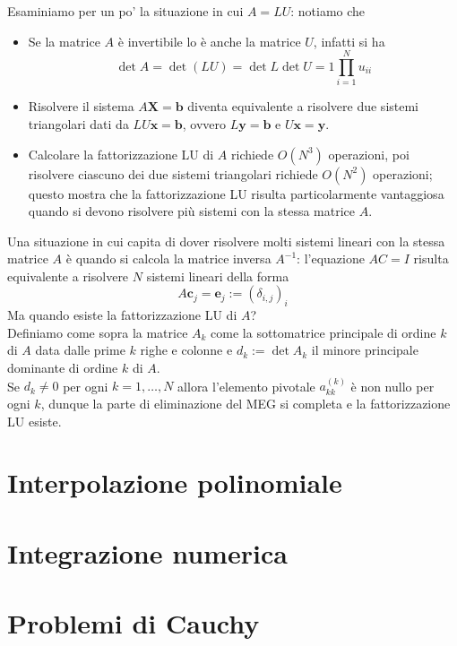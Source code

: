 \documentclass[openany]{book}
\begin{document}
Esaminiamo per un po' la situazione in cui $A = LU$: notiamo che\begin{itemize}
    \item Se la matrice $A$ è invertibile lo è anche la matrice $U$, infatti si ha 
    \[\det A = \det(LU) = \det L \det U = 1 \prod_{i=1}^N u_{ii}\]
    \item Risolvere il sistema $A\mathbf X = \mathbf b$ diventa equivalente a risolvere due sistemi triangolari dati da $LU\mathbf x = \mathbf b$, ovvero $L\mathbf y = \mathbf b$ e $U\mathbf x = \mathbf y$.
    \item Calcolare la fattorizzazione LU di $A$ richiede $O(N^3)$ operazioni, poi risolvere ciascuno dei due sistemi triangolari richiede $O(N^2)$ operazioni; questo mostra che la fattorizzazione LU risulta particolarmente vantaggiosa quando si devono risolvere più sistemi con la stessa matrice $A$.
\end{itemize}
Una situazione in cui capita di dover risolvere molti sistemi lineari con la stessa matrice $A$ è quando si calcola la matrice inversa $A^{-1}$: l'equazione $A C = I$ risulta equivalente a risolvere $N$ sistemi lineari della forma 
\[ A \mathbf c_j = \mathbf e_j := (\delta_{i,j})_i \]
Ma quando esiste la fattorizzazione LU di $A$?\\
Definiamo come sopra la matrice $A_k$ come la sottomatrice principale di ordine $k$ di $A$ data dalle prime $k$ righe e colonne e $d_k := \det A_k$ il minore principale dominante di ordine $k$ di $A$.\\
Se $d_k \neq 0$ per ogni $k=1,\dots, N$ allora l'elemento pivotale $a_{kk}^{(k)}$ è non nullo per ogni $k$, dunque la parte di eliminazione del MEG si completa e la fattorizzazione LU esiste.

\chapter{Interpolazione polinomiale}

\chapter{Integrazione numerica}

\chapter{Problemi di Cauchy}
\end{document}
